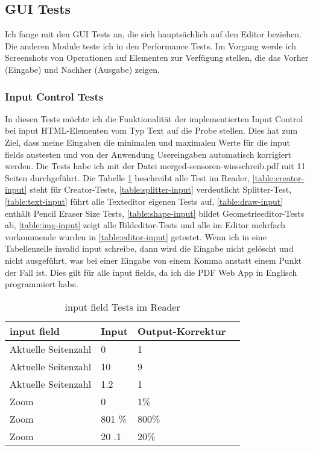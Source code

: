 \subsection{GUI Tests}
Ich fange mit den GUI Tests an, die sich hauptsächlich auf den Editor beziehen. Die anderen Module teste ich in den Performance Tests. Im Vorgang werde ich Screenshots von Operationen auf Elementen zur Verfügung stellen, die das Vorher (Eingabe) und Nachher (Ausgabe) zeigen.

\subsubsection{Input Control Tests}
In diesen Tests möchte ich die Funktionalität der implementierten Input Control bei input HTML-Elementen vom Typ Text auf die Probe stellen. Dies hat zum Ziel, dass meine Eingaben die minimalen und maximalen Werte für die input fields austesten und von der Anwendung Usereingaben automatisch korrigiert werden. Die Tests habe ich mit der Datei merged-sensoren-wissschreib.pdf mit 11 Seiten durchgeführt. Die Tabelle \ref{table:reader-input} beschreibt alle Test im Reader, \ref{table:creator-input} steht für Creator-Tests, \ref{table:splitter-input} verdeutlicht Splitter-Test, \ref{table:text-input} führt alle Texteditor eigenen Tests auf, \ref{table:draw-input} enthält Pencil Eraser Size Tests, \ref{table:shape-input} bildet Geometrieeditor-Tests ab, \ref{table:img-input} zeigt alle Bildeditor-Tests und alle im Editor mehrfach vorkommende wurden in \ref{table:editor-input} getestet. Wenn ich in eine Tabellenzelle invalid input schreibe, dann wird die Eingabe nicht gelöscht und nicht ausgeführt, was bei einer Eingabe von einem Komma anstatt einem Punkt der Fall ist. Dies gilt für alle input fields, da ich die PDF Web App in Englisch programmiert habe. 

\begin{table}[!htbp]
	\centering
	\begin{tabular}{|p{4cm}|p{3cm}|p{3cm}|p{3cm}|}
		\hline
		\textbf{input field}				& \textbf{Input} 	& \textbf{Output-Korrektur}	\\ 
		\hline
		Aktuelle Seitenzahl					& 0 				& 1							\\ 
		Aktuelle Seitenzahl					& 10 				& 9 						\\ 
		Aktuelle Seitenzahl					& 1.2 				& 1 						\\ 
		Zoom 								& 0					& 1\%  						\\
		Zoom 								& 801 \% 			& 800\% 					\\ 
		Zoom 								& 20 .1 			& 20\% 						\\ 
		\hline
	\end{tabular}
	\caption{input field Tests im Reader}
	\label{table:reader-input}
\end{table}	

